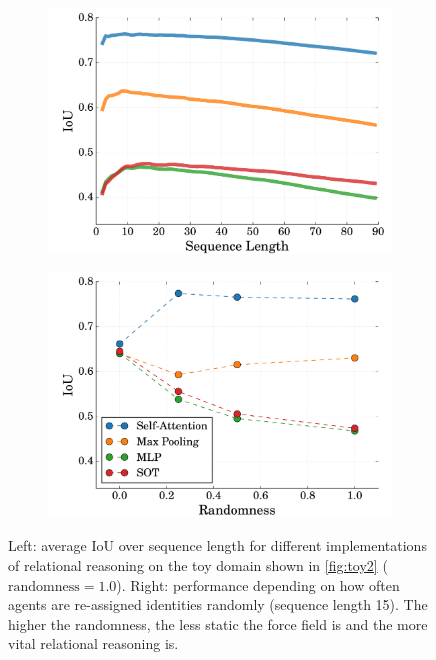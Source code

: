 \begin{figure}
    \centering
    \begin{subfigure}[c]{0.49\linewidth}
        \centering
        \includegraphics[width=\linewidth]{figures/MOHART/toy_iou_over_timesteps}
    \end{subfigure}
    \begin{subfigure}[c]{0.49\linewidth}
        \centering
        \includegraphics[width=\linewidth]{figures/MOHART/dial}
    \end{subfigure}
    \vspace{-2mm}
    \caption{
        Left: average IoU over sequence length for different implementations of relational reasoning on the toy domain shown in \cref{fig:toy2} ($\text{randomness} = 1.0$). Right: performance depending on how often agents are re-assigned identities randomly (sequence length 15). The higher the randomness, the less static the force field is and the more vital relational reasoning is. 
        \vspace{-4mm}
    }
    \label{fig:toy_quant}
\end{figure}

